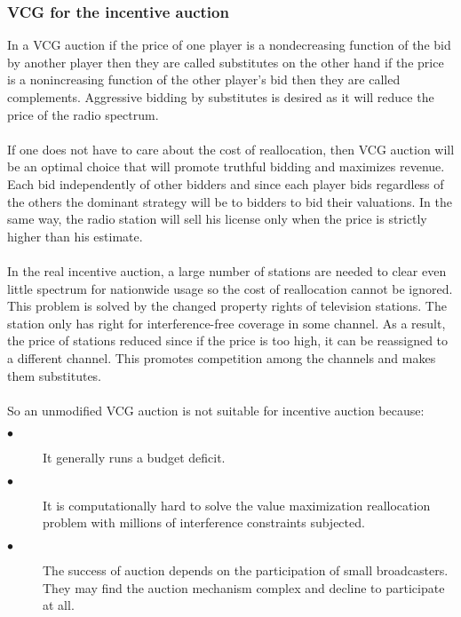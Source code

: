 \documentclass[a4paper]{article}
\begin{document}
\subsubsection*{VCG for the incentive auction}

In a VCG auction if the price of one player is a nondecreasing function of the bid by another player then they are called substitutes on the other hand if the price is a nonincreasing function of the other player's bid then they are called complements. Aggressive bidding by substitutes is desired as it will reduce the price of the radio spectrum.
\\\\
If one does not have to care about the cost of reallocation, then VCG auction will be an optimal choice that will promote truthful bidding and maximizes revenue. Each bid independently of other bidders and since each player bids regardless of the others the dominant strategy will be to bidders to bid their valuations. In the same way, the radio station will sell his license only when the price is strictly higher than his estimate.
\\\\
In the real incentive auction, a large number of stations are needed to clear even little spectrum for nationwide usage so the cost of reallocation cannot be ignored. This problem is solved by the changed property rights of television stations. The station only has right for interference-free coverage in some channel. As a result, the price of stations reduced since if the price is too high, it can be reassigned to a different channel. This promotes competition among the channels and makes them substitutes.
\\\\
So an unmodified VCG auction is not suitable for incentive auction because:

\begin{description}

\item[$\bullet$] It generally runs a budget deficit.
\item[$\bullet$] It is computationally hard to solve the value maximization reallocation problem with millions of interference constraints subjected.
\item[$\bullet$] The success of auction depends on the participation of small broadcasters. They may find the auction mechanism complex and decline to participate at all.

\end{description}
\end{document}
